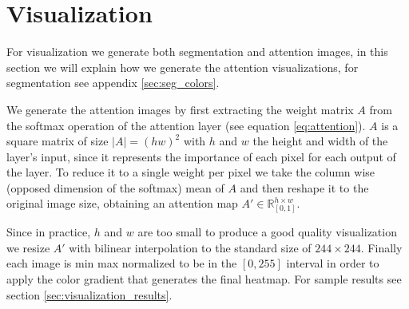 \section{Visualization}
For visualization we generate both segmentation and attention images, in this section
we will explain how we generate the attention visualizations, for segmentation see appendix \ref{sec:seg_colors}.

We generate the attention images by first extracting the weight matrix $A$ from the softmax operation
of the attention layer (see equation \ref{eq:attention}). $A$  is a square matrix of size
$|A|=(hw)^2$ with $h$ and $w$ the height and width of the layer's input, since it represents
the importance of each pixel for each output of the layer. To reduce it to a single weight per pixel
we take the column wise (opposed dimension of the softmax)  mean of $A$ and
then reshape it to the original image size, obtaining an attention map $A' \in \mathbb{R}_{[0,1]}^{h \times w}$.

Since in practice, $h$ and $w$ are too small to produce a good quality visualization we resize $A'$ with
bilinear interpolation to the standard size of $244 \times 244$. Finally each image is min max normalized to be in
the $[0, 255]$ interval in order to apply the color gradient that generates the final heatmap.
For sample results see section \ref{sec:visualization_results}.